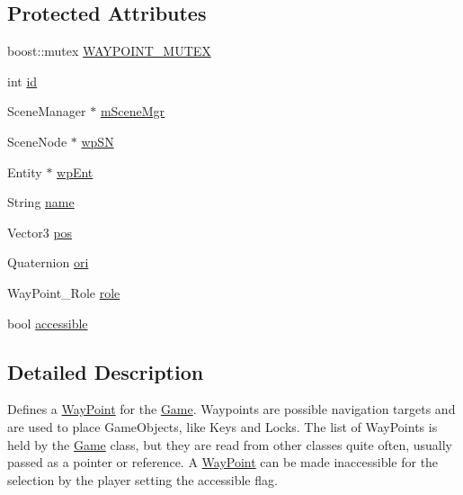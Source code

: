 \subsection*{\-Protected \-Attributes}
\begin{DoxyCompactItemize}
\item 
boost\-::mutex \hyperlink{classWayPoint_ac889b89eb8c36244c7b937bed5c2d77e}{\-W\-A\-Y\-P\-O\-I\-N\-T\-\_\-\-M\-U\-T\-E\-X}
\item 
int \hyperlink{classWayPoint_a01b5cf642bf27270f3eb44adfe7de271}{id}
\item 
\-Scene\-Manager $\ast$ \hyperlink{classWayPoint_a8a18ed96355454b4f1713d196aff2216}{m\-Scene\-Mgr}
\item 
\-Scene\-Node $\ast$ \hyperlink{classWayPoint_aeb4358a9171b219b8f0281cf84b5b6e0}{wp\-S\-N}
\item 
\-Entity $\ast$ \hyperlink{classWayPoint_a604e3fa32b79b6e2c9fabcf321f7c774}{wp\-Ent}
\item 
\-String \hyperlink{classWayPoint_aca34a5b321d0f27d810a3097c3ef0f3a}{name}
\item 
\-Vector3 \hyperlink{classWayPoint_aaace5c39e2b733295ef37de4228eb115}{pos}
\item 
\-Quaternion \hyperlink{classWayPoint_a5335f01d55f54a40acf21fa25d93efc0}{ori}
\item 
\-Way\-Point\-\_\-\-Role \hyperlink{classWayPoint_aed5b54453c7dc642ee8125158942ccd0}{role}
\item 
bool \hyperlink{classWayPoint_aae4377ca4bb86993f6572403e1d7e71c}{accessible}
\end{DoxyCompactItemize}


\subsection{\-Detailed \-Description}
\-Defines a \hyperlink{classWayPoint}{\-Way\-Point} for the \hyperlink{classGame}{\-Game}. \-Waypoints are possible navigation targets and are used to place \-Game\-Objects, like \-Keys and \-Locks. \-The list of \-Way\-Points is held by the \hyperlink{classGame}{\-Game} class, but they are read from other classes quite often, usually passed as a pointer or reference. \-A \hyperlink{classWayPoint}{\-Way\-Point} can be made inaccessible for the selection by the player setting the accessible flag. 

